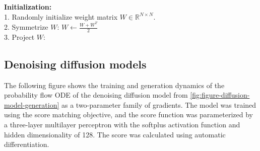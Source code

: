\documentclass[12pt]{article}
\newcommand\colorAutoref[1]{{\hypersetup{linkcolor=blue}\autoref{#1}}}  %
\begin{document}
\vspace{1em}
\begin{algorithm}[H]
\caption{Projected Gradient Descent Hebbian Learning}
\label{algorithm:hebbian-learning-pgd}
\SetAlgoLined
{} 
\vspace{0.5em}
\textbf{Initialization:} \\
1. Randomly initialize weight matrix \( W \in \mathbb{R}^{N \times N} \). \\
2. Symmetrize $W$:
\hspace{1mm} $W \leftarrow \frac{W + W^T}{2}$ \\
3. Project $W$: \\
\vspace{0.5em}
\end{algorithm}


\subsection{Denoising diffusion models}
The following figure shows the training and generation dynamics of the probability flow ODE of the denoising diffusion model from \colorAutoref{fig:figure-diffusion-model-generation} as a two-parameter family of gradients. The model was trained using the score matching objective, and the score function was parameterized by a three-layer multilayer perceptron with the softplus activation function and hidden dimensionality of 128. The score was calculated using automatic differentiation.
\end{document}
